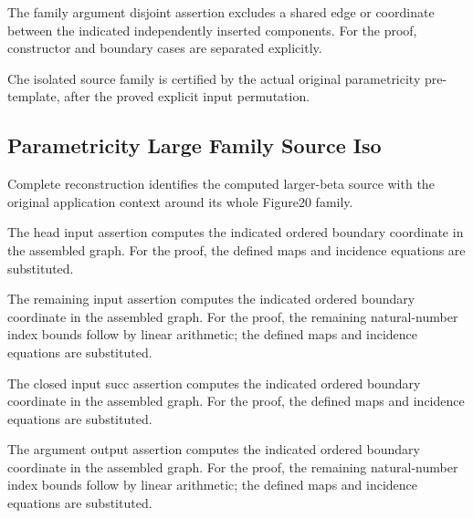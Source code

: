 The family argument disjoint assertion excludes a shared edge or coordinate between the indicated independently inserted components.
For the proof, constructor and boundary cases are separated explicitly.
\par{}

Che isolated source family is certified by the actual original parametricity pre-template, after the proved explicit input permutation.
\par{}

\subsection{Parametricity Large Family Source Iso}
Complete reconstruction identifies the computed larger-beta source with the original application context around its whole Figure20 family.

The head input assertion computes the indicated ordered boundary coordinate in the assembled graph.
For the proof, the defined maps and incidence equations are substituted.
\par{}

The remaining input assertion computes the indicated ordered boundary coordinate in the assembled graph.
For the proof, the remaining natural-number index bounds follow by linear arithmetic; the defined maps and incidence equations are substituted.
\par{}

The closed input succ assertion computes the indicated ordered boundary coordinate in the assembled graph.
For the proof, the defined maps and incidence equations are substituted.
\par{}

The argument output assertion computes the indicated ordered boundary coordinate in the assembled graph.
For the proof, the remaining natural-number index bounds follow by linear arithmetic; the defined maps and incidence equations are substituted.
\par{}

